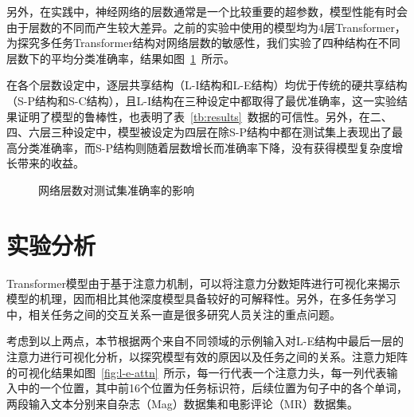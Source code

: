 另外，在实践中，神经网络的层数通常是一个比较重要的超参数，模型性能有时会由于层数的不同而产生较大差异。之前的实验中使用的模型均为4层Transformer，为探究多任务Transformer结构对网络层数的敏感性，我们实验了四种结构在不同层数下的平均分类准确率，结果如图~\ref{fig:layer_dis}~所示。

在各个层数设定中，逐层共享结构（L-I结构和L-E结构）均优于传统的硬共享结构（S-P结构和S-C结构），且L-I结构在三种设定中都取得了最优准确率，这一实验结果证明了模型的鲁棒性，也表明了表~\ref{tb:results}~数据的可信性。另外，在二、四、六层三种设定中，模型被设定为四层在除S-P结构中都在测试集上表现出了最高分类准确率，而S-P结构则随着层数增长而准确率下降，没有获得模型复杂度增长带来的收益。

\begin{figure}[h!]
	\centering
	\caption{网络层数对测试集准确率的影响}
	\label{fig:layer_dis}
\end{figure}
\section{实验分析}
\label{sec:analysis}
Transformer模型由于基于注意力机制，可以将注意力分数矩阵进行可视化来揭示模型的机理，因而相比其他深度模型具备较好的可解释性。另外，在多任务学习中，相关任务之间的交互关系一直是很多研究人员关注的重点问题。

考虑到以上两点，本节根据两个来自不同领域的示例输入对L-E结构中最后一层的注意力进行可视化分析，以探究模型有效的原因以及任务之间的关系。注意力矩阵的可视化结果如图~\ref{fig:l-e-attn}~所示，每一行代表一个注意力头，每一列代表输入中的一个位置，其中前16个位置为任务标识符，后续位置为句子中的各个单词，两段输入文本分别来自杂志（Mag）数据集和电影评论（MR）数据集。

